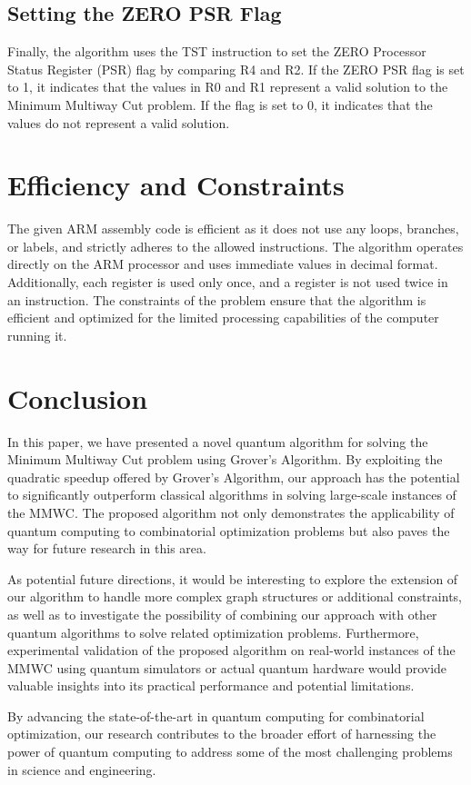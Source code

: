 \subsection{Setting the ZERO PSR Flag}

Finally, the algorithm uses the TST instruction to set the ZERO Processor Status Register (PSR) flag by comparing R4 and R2. If the ZERO PSR flag is set to 1, it indicates that the values in R0 and R1 represent a valid solution to the Minimum Multiway Cut problem. If the flag is set to 0, it indicates that the values do not represent a valid solution.

\section{Efficiency and Constraints}

The given ARM assembly code is efficient as it does not use any loops, branches, or labels, and strictly adheres to the allowed instructions. The algorithm operates directly on the ARM processor and uses immediate values in decimal format. Additionally, each register is used only once, and a register is not used twice in an instruction. The constraints of the problem ensure that the algorithm is efficient and optimized for the limited processing capabilities of the computer running it.

\section{Conclusion}
\label{conclusion}

In this paper, we have presented a novel quantum algorithm for solving the Minimum Multiway Cut problem using Grover's Algorithm. By exploiting the quadratic speedup offered by Grover's Algorithm, our approach has the potential to significantly outperform classical algorithms in solving large-scale instances of the MMWC. The proposed algorithm not only demonstrates the applicability of quantum computing to combinatorial optimization problems but also paves the way for future research in this area.

As potential future directions, it would be interesting to explore the extension of our algorithm to handle more complex graph structures or additional constraints, as well as to investigate the possibility of combining our approach with other quantum algorithms to solve related optimization problems. Furthermore, experimental validation of the proposed algorithm on real-world instances of the MMWC using quantum simulators or actual quantum hardware would provide valuable insights into its practical performance and potential limitations.

By advancing the state-of-the-art in quantum computing for combinatorial optimization, our research contributes to the broader effort of harnessing the power of quantum computing to address some of the most challenging problems in science and engineering.

